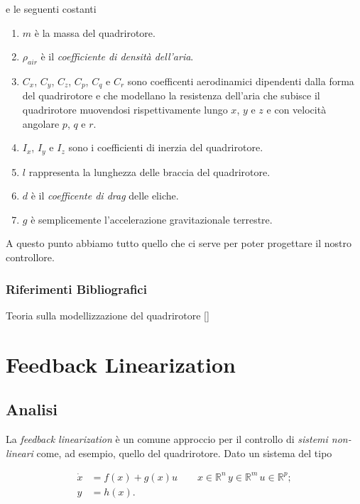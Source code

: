 \documentclass[a4paper,10pt]{article}
\begin{document}
e le seguenti costanti

\begin{enumerate}
\item $m$ è la massa del quadrirotore.
\item $\rho_{air}$ è il \emph{coefficiente di densità dell'aria}.
\item $C_x$, $C_y$, $C_z$, $C_p$, $C_q$ e $C_r$ sono coefficenti aerodinamici dipendenti dalla forma del quadrirotore e che modellano la resistenza dell'aria che subisce il quadrirotore muovendosi rispettivamente lungo $x$, $y$ e $z$ e con velocità angolare $p$, $q$ e $r$.
\item $I_x$, $I_y$ e $I_z$ sono i coefficienti di inerzia del quadrirotore.
\item $l$ rappresenta la lunghezza delle braccia del quadrirotore.
\item $d$ è il \emph{coefficente di drag} delle eliche.
\item $g$ è semplicemente l'accelerazione gravitazionale terrestre.
\end{enumerate}

A questo punto abbiamo tutto quello che ci serve per poter progettare il nostro controllore.

\subsubsection*{Riferimenti Bibliografici}

Teoria sulla modellizzazione del quadrirotore [\cite{Mistler2001}]
\newpage
\section{Feedback Linearization}

\subsection{Analisi}

La \emph{feedback linearization} è un comune approccio per il controllo di \emph{sistemi non-lineari} come, ad esempio, quello del quadrirotore. Dato un sistema del tipo

\begin{equation}
\begin{split}
\dot{x} &= f(x) + g(x)u \qquad x \in \mathbb{R}^{n}\, y \in \mathbb{R}^{m} \, u \in \mathbb{R}^{p}; \\
y &= h(x).
\label{eq:nonlinear}
\end{split}
\end{equation}
\end{document}
